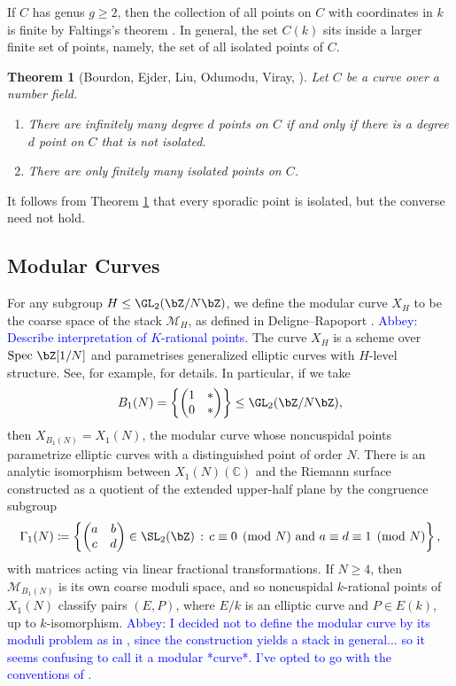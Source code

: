 \documentclass[11pt,reqno]{amsart}
\theoremstyle{plain}
\newtheorem{theorem}{Theorem}%
\theoremstyle{definition}
\newcommand{\Z}{\bZ}
\newcommand{\abbey}[1]{\textcolor{blue}{Abbey: #1}}
\begin{document}
If $C$ has genus $g\geq 2$, then the collection of all points on $C$ with coordinates in $k$ is finite by Faltings's theorem \cite{faltings83}. In general, the set $C(k)$ sits inside a larger finite set of points, namely, the set of all isolated points of $C$.
    \begin{theorem}[{Bourdon, Ejder, Liu, Odumodu, Viray, \cite[Theorem 4.2]{BELOV}}]\label{thm:FiniteIsolated}
        Let $C$ be a curve over a number field.
        \begin{enumerate}
            \item There are infinitely many degree $d$ points on $C$ if and only if there is a degree $d$ point on $C$ that is \emph{not} isolated.
            \item There are only finitely many isolated points on $C$.
        \end{enumerate}
    \end{theorem}
It follows from Theorem \ref{thm:FiniteIsolated} that every sporadic point is isolated, but the converse need not hold.

\subsection{Modular Curves}
For any subgroup $H \leq \GL_2(\Z/N\Z)$, we define the modular curve $X_H$ to be the coarse space of the stack $\mathcal{M}_H$, as defined in Deligne--Rapoport \cite{DR}. \abbey{Describe interpretation of $K$-rational points.} The curve $X_H$ is a scheme over $\text{Spec }\Z[1/N]$ and parametrises generalized elliptic curves with $H$-level structure. See, for example, \cite[$\S2.3$]{RSZB2022} for details. In particular, if we take
\[
B_1(N) =\left\{ \begin{pmatrix}
1 & * \\
0 & *
\end{pmatrix} \right \} \leq \GL_2(\Z/N\Z),
\]
then $X_{B_1(N)}=X_1(N)$, the modular curve whose noncuspidal points parametrize  elliptic curves with a distinguished point of order $N$. There is an analytic isomorphism between $X_1(N)(\mathbb{C})$ and the Riemann surface constructed as a quotient of the extended upper-half plane by the congruence subgroup
\[
\Gamma_1(N) \coloneqq\left\{ \begin{pmatrix}
a & b \\
c & d 
\end{pmatrix} \in \SL_2(\Z) \, : \, c \equiv 0 \pmod{N} \text{ and } a \equiv d \equiv 1 \pmod{N} \right \}, 
\]
with matrices acting via linear fractional transformations. If $N \geq 4$, then $\mathcal{M}_{B_1(N)}$ is its own coarse moduli space, and so noncuspidal $k$-rational points of $X_1(N)$ classify pairs $(E,P)$, where $E/k$ is an elliptic curve and $P\in E(k)$, up to $k$-isomorphism. \abbey{I decided not to define the modular curve by its moduli problem as in \cite[$\S2$]{RouseDZB}, since the construction yields a stack in general... so it seems confusing to call it a modular *curve*. I've opted to go with the conventions of \cite[$\S2.3$]{RSZB2022}.}
\end{document}
